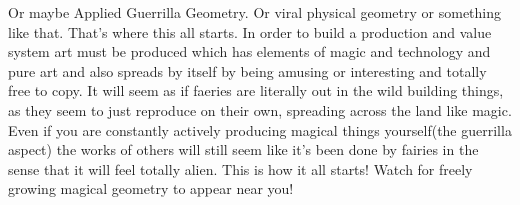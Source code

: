 Or maybe Applied Guerrilla Geometry. Or viral physical geometry or
something like that. That's where this all starts. In order to build a
production and value system art must be produced which has elements of
magic and technology and pure art and also spreads by itself by being
amusing or interesting and totally free to copy. It will seem as if
faeries are literally out in the wild building things, as they seem to
just reproduce on their own, spreading across the land like magic. Even
if you are constantly actively producing magical things yourself(the
guerrilla aspect) the works of others will still seem like it's been
done by fairies in the sense that it will feel totally alien. This is
how it all starts! Watch for freely growing magical geometry to appear
near you!
